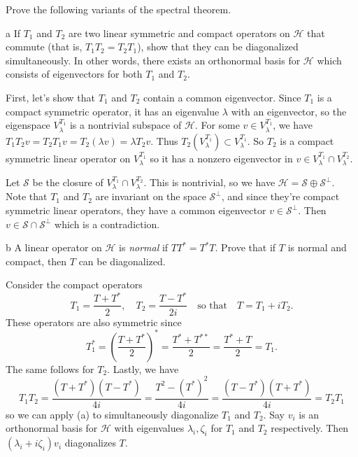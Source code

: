\documentclass[11pt,letterpaper]{article}
\def\H{\mathcal{H}}
\def\S{\mathcal{S}}
\begin{document}
\begin{solution}
    Prove the following variants of the spectral theorem.
    \begin{partproblem}{a}
        If $T_1$ and $T_2$ are two linear symmetric and compact operators on $\H$ that commute (that is, $T_1T_2=T_2T_1$), show that they can be diagonalized simultaneously. In other words, there exists an orthonormal basis for $\H$ which consists of eigenvectors for both $T_1$ and $T_2$.
    \end{partproblem}

    \quad First, let's show that $T_1$ and $T_2$ contain a common eigenvector. Since $T_1$ is a compact symmetric operator, it has an eigenvalue $\lambda$ with an eigenvector, so the eigenspace $V^{T_1}_\lambda$ is a nontrivial subspace of $\H$. For some $v\in V^{T_1}_\lambda$, we have $T_1T_2v=T_2T_1v=T_2(\lambda v)=\lambda T_2 v$. Thus $T_2(V^{T_1}_\lambda)\subset V^{T_1}_\lambda$. So $T_2$ is a compact symmetric linear operator on $V^{T_1}_\lambda$ so it has a nonzero eigenvector in $v\in V_\lambda^{T_1}\cap V_\lambda^{T_2}$.

    \quad Let $\S$ be the closure of $V^{T_1}_\lambda\cap V^{T_2}_\lambda$. This is nontrivial, so we have $\H=\S\oplus\S^\perp$. Note that $T_1$ and $T_2$ are invariant on the space $\S^\perp$, and since they're compact symmetric linear operators, they have a common eigenvector $v\in \S^\perp$. Then $v\in \S\cap \S^\perp$ which is a contradiction.

    \begin{partproblem}{b}
        A linear operator on $\H$ is \emph{normal} if $TT^*=T^*T$. Prove that if $T$ is normal and compact, then $T$ can be diagonalized.
    \end{partproblem}

    \quad Consider the compact operators
    \[
        T_1 = \frac{T+T^*}{2}, \quad T_2=\frac{T-T^*}{2i}\quad\text{so that}\quad T=T_1+iT_2
    .\] 
    These operators are also symmetric since
    \[
        T_1^* = \left(\frac{T+T^*}{2}\right)^* = \frac{T^*+T^{**}}{2}=\frac{T^*+T}{2}=T_1
    .\]
    The same follows for $T_2$. Lastly, we have
    \[
        T_1T_2=\frac{(T+T^*)(T-T^*)}{4i}=\frac{T^2-(T^*)^2}{4i}=\frac{(T-T^*)(T+T^*)}{4i}=T_2T_1
    \]
    so we can apply (a) to simultaneously diagonalize $T_1$ and $T_2$. Say $v_i$ is an orthonormal basis for $\H$ with eigenvalues $\lambda_i, \zeta_i$ for $T_1$ and $T_2$ respectively. Then $(\lambda_i+i\zeta_i)v_i$ diagonalizes $T$. 
\end{solution}
\end{document}

